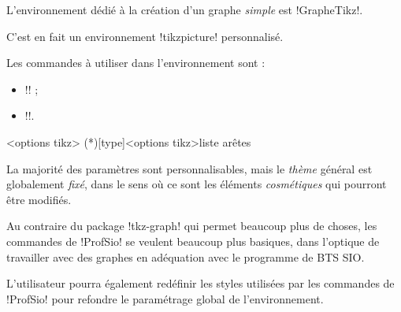 \documentclass[french,a4paper,11pt]{article}
\begin{document}
{{\begin{cautionblock}
L'environnement dédié à la création d'un graphe \textit{simple} est \motcletex!GrapheTikz!.

C'est en fait un environnement \motcletex!tikzpicture! personnalisé.

\smallskip

Les commandes à utiliser dans l'environnement sont :

\begin{itemize}
	\item \motcletex!\GrphPlaceSommets! ;
	\item \motcletex!\GrphTraceAretes!.
\end{itemize}
\vspace*{-\baselineskip}\leavevmode
\end{cautionblock}

\begin{DemoCode}
\begin{GrapheTikz}[clés]<options tikz>
	\GrphTraceAretes(*)[type]<options tikz>{liste arêtes}
\end{GrapheTikz}
\end{DemoCode}

\begin{DemoCode}[]
\begin{GrapheTikz}
\end{GrapheTikz}
\end{DemoCode}

\begin{warningblock}
La majorité des paramètres sont personnalisables, mais le \textit{thème} général est globalement \textit{fixé}, dans le sens où ce sont les éléments \textit{cosmétiques} qui pourront être modifiés.

\smallskip

Au contraire du package \packagetex!tkz-graph! qui permet beaucoup plus de choses, les commandes de \packagetex!ProfSio! se veulent beaucoup plus basiques, dans l'optique de travailler avec des graphes en adéquation avec le programme de BTS SIO.
\end{warningblock}

\begin{noteblock}
L'utilisateur pourra également redéfinir les styles utilisées par les commandes de \packagetex!ProfSio! pour refondre le paramétrage global de l'environnement.
\end{noteblock}

}}
\end{document}
